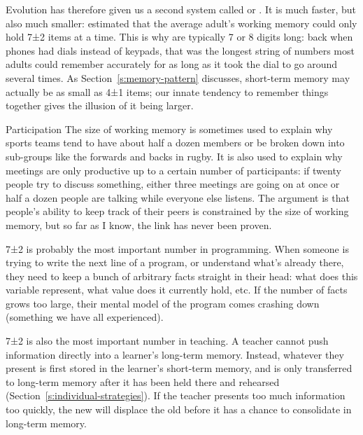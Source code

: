 Evolution has therefore given us a second system called
 or . It is much faster, but also much smaller:
\cite{Mill1956} estimated that the average adult's working memory
could only hold 7±2 items at a time. This is why  are typically 7 or 8 digits long: back when
phones had dials instead of keypads, that was the longest string of
numbers most adults could remember accurately for as long as it took
the dial to go around several times. As Section~\ref{s:memory-pattern}
discusses, short-term memory may actually be as small as 4±1 items;
our innate tendency to remember things together gives the illusion of
it being larger.

\begin{aside}{Participation}
  The size of working memory is sometimes used to explain why sports
  teams tend to have about half a dozen members or be broken down into
  sub-groups like the forwards and backs in rugby. It is also used to
  explain why meetings are only productive up to a certain number of
  participants: if twenty people try to discuss something, either three
  meetings are going on at once or half a dozen people are talking while
  everyone else listens. The argument is that people's ability to keep
  track of their peers is constrained by the size of working memory, but
  so far as I know, the link has never been proven.
\end{aside}

7±2 is probably the most important number in programming. When
someone is trying to write the next line of a program, or understand
what's already there, they need to keep a bunch of arbitrary facts
straight in their head: what does this variable represent, what value
does it currently hold, etc. If the number of facts grows too large,
their mental model of the program comes crashing down (something we have
all experienced).

7±2 is also the most important number in teaching. A teacher cannot
push information directly into a learner's long-term memory. Instead,
whatever they present is first stored in the learner's short-term
memory, and is only transferred to long-term memory after it has been
held there and rehearsed (Section~\ref{s:individual-strategies}). If the
teacher presents too much information too quickly, the new will
displace the old before it has a chance to consolidate in long-term
memory.

